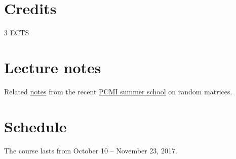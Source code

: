 \documentclass[a4paper]{article}
\begin{document}
\section{Credits%
  \label{credits}%
}

3 ECTS


\section{Lecture notes%
  \label{lecture-notes}%
}

Related \href{pcmi.pdf}{notes} from the recent \href{https://pcmi.ias.edu/program-index/2017ss}{PCMI summer school} on random matrices.


\section{Schedule%
  \label{schedule}%
}

The course lasts from October 10 – November 23, 2017.
\end{document}
